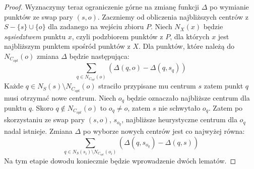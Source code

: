 \begin{proof}
    Wyznaczymy teraz ograniczenie górne na zmianę funkcji $\Delta$ po wymianie punktów ze swap pary $(s, o)$.
    Zaczniemy od obliczenia najbliższych centrów z $S - \{s\} \cup \{o\}$ dla zadanego na wejściu zbioru $P$.
    Niech $N_{X}(x)$ będzie \textit{sąsiedztwem} punktu $x$, czyli podzbiorem punktów z $P$, dla których $x$ jest najbliższym punktem spośród punktów z $X$. 
    Dla punktów, które należą do $N_{C_{opt}}(o)$ zmiana $\Delta$ będzie następująca:
    \begin{equation}
        \sum_{q \in N_{C_{opt}}(o)} (\Delta(q, o) - \Delta(q, s_{q}))
    \end{equation}
    Każde $q \in N_{S}(s) \setminus N_{C_{opt}}(o)$ straciło przypisane mu centrum $s$ zatem punkt $q$ musi otrzymać nowe centrum.
    Niech $o_{q}$ będzie oznaczało najbliższe centrum dla punktu $q$.
    Skoro $q \notin N_{C_{opt}}(o)$ to $o_{q} \neq o$, zatem $s$ nie schwytało $o_{q}$.
    Zatem po skorzystaniu ze swap pary $(s,o)$, $s_{o_{q}}$, najbliższe heurystyczne centrum dla $o_{q}$ nadal istnieje.
    Zmiana $\Delta$ po wyborze nowych centrów jest co najwyżej równa:
    \begin{equation}
        \sum_{q \in N_{S}(s_{i}) \setminus N_{C_{opt}}(o_{i})} (\Delta(q, s_{o_{q}}) - \Delta(q, s))
    \end{equation}
    Na tym etapie dowodu koniecznie będzie wprowadzenie dwóch lematów.
    

\end{proof}
